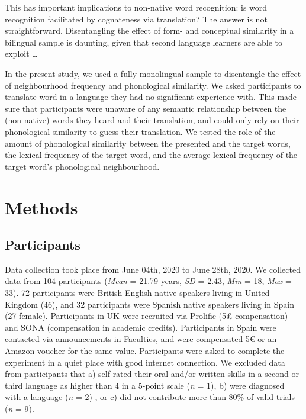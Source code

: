 \documentclass[
  man]{apa6}
\begin{document}
This has important implications to non-native word recognition: is word
recognition facilitated by cognateness via translation? The answer is
not straightforward. Disentangling the effect of form- and conceptual
similarity in a bilingual sample is daunting, given that second language
learners are able to exploit \ldots{}

In the present study, we used a fully monolingual sample to disentangle
the effect of neighbourhood frequency and phonological similarity. We
asked participants to translate word in a language they had no
significant experience with. This made sure that participants were
unaware of any semantic relationship between the (non-native) words they
heard and their translation, and could only rely on their phonological
similarity to guess their translation. We tested the role of the amount
of phonological similarity between the presented and the target words,
the lexical frequency of the target word, and the average lexical
frequency of the target word's phonological neighbourhood.

\hypertarget{methods}{%
\section{Methods}\label{methods}}

\hypertarget{participants}{%
\subsection{Participants}\label{participants}}

Data collection took place from June 04th, 2020 to June 28th, 2020. We
collected data from 104 participants (\emph{Mean} = 21.79 years,
\emph{SD} = 2.43, \emph{Min} = 18, \emph{Max} = 33). 72 participants
were British English native speakers living in United Kingdom (46), and
32 participants were Spanish native speakers living in Spain (27
female). Participants in UK were recruited via Prolific (5£
compensation) and SONA (compensation in academic credits). Participants
in Spain were contacted via announcements in Faculties, and were
compensated 5€ or an Amazon voucher for the same value. Participants
were asked to complete the experiment in a quiet place with good
internet connection. We excluded data from participants that a)
self-rated their oral and/or written skills in a second or third
language as higher than 4 in a 5-point scale (\emph{n} = 1), b) were
diagnosed with a language (\emph{n} = 2) , or c) did not contribute more
than 80\% of valid trials (\emph{n} = 9).
\end{document}
